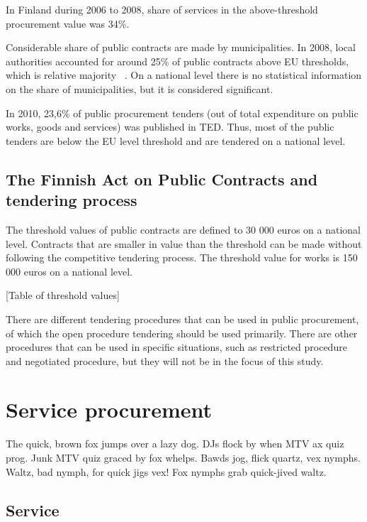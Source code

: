 \documentclass[12pt,a4paper,oneside,pdftex]{report}
\begin{document}
In Finland during 2006 to 2008, share of services in the above-threshold procurement value was 34\%. ~\citep{EU2010}

Considerable share of public contracts are made by municipalities. In 2008, local authorities accounted for around 25\% of public contracts above EU thresholds, which is relative majority ~\citep{EU2010}. On a national level there is no statistical information on the share of municipalities, but it is considered significant.

In 2010, 23,6\% of public procurement tenders (out of total expenditure on public works, goods and services) was published in TED. Thus, most of the public tenders are below the EU level threshold and are tendered on a national level.

\subsection {The Finnish Act on Public Contracts and tendering process}

The threshold values of public contracts are defined to 30 000 euros on a national level. Contracts that are smaller in value than the threshold can be made without following the competitive tendering process. The threshold value for works is 150 000 euros on a national level. ~\citep{Hankintaopas}

[Table of threshold values]

There are different tendering procedures that can be used in public procurement, of which the open procedure tendering should be used primarily. There are other procedures that can be used in specific situations, such as restricted procedure and negotiated procedure, but they will not be in the focus of this study. 



\section{Service procurement}

The quick, brown fox jumps over a lazy dog. DJs flock by when MTV ax quiz prog. Junk MTV quiz graced by fox whelps. Bawds jog, flick quartz, vex nymphs. Waltz, bad nymph, for quick jigs vex! Fox nymphs grab quick-jived waltz. 

\subsection{Service }
\end{document}
